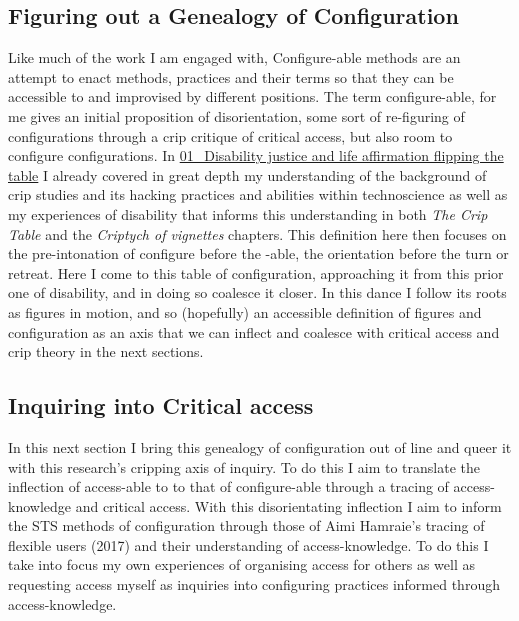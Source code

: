 \hypertarget{figuring-out-a-genealogy-of-configuration-1}{%
\subsection[Figuring out a Genealogy of
Configuration]{\texorpdfstring{\protect\hypertarget{anchor}{}{}Figuring
out a Genealogy of
Configuration}{Figuring out a Genealogy of Configuration}}\label{figuring-out-a-genealogy-of-configuration-1}}

Like much of the work I am engaged with, Configure-able methods are an
attempt to enact methods, practices and their terms so that they can be
accessible to and improvised by different positions. The term
configure-able, for me gives an initial proposition of disorientation,
some sort of re-figuring of configurations through a crip critique of
critical access, but also room to configure configurations. In
\href{../../01_Disability_justice_and_life_affirmation_flipping_the_table/01_Disability\%20justice\%20and\%20life\%20affirmation\%20flipping\%20the\%20table.md}{01\_Disability
justice and life affirmation flipping the table} I already covered in
great depth my understanding of the background of crip studies and its
hacking practices and abilities within technoscience as well as my
experiences of disability that informs this understanding in both
\emph{The Crip Table} and the \emph{Criptych of vignettes} chapters.
This definition here then focuses on the pre-intonation of configure
before the -able, the orientation before the turn or retreat. Here I
come to this table of configuration, approaching it from this prior one
of disability, and in doing so coalesce it closer. In this dance I
follow its roots as figures in motion, and so (hopefully) an accessible
definition of figures and configuration as an axis that we can inflect
and coalesce with critical access and crip theory in the next sections.

\hypertarget{inquiring-into-critical-access}{%
\subsection[Inquiring into Critical
access]{\texorpdfstring{\protect\hypertarget{anchor}{}{}Inquiring into
Critical
access}{Inquiring into Critical access}}\label{inquiring-into-critical-access}}

In this next section I bring this genealogy of configuration out of line
and queer it with this research's cripping axis of inquiry. To do this I
aim to translate the inflection of access-able to to that of
configure-able through a tracing of access-knowledge and critical
access. With this disorientating inflection I aim to inform the STS
methods of configuration through those of Aimi Hamraie's tracing of
flexible users (2017) and their understanding of access-knowledge. To do
this I take into focus my own experiences of organising access for
others as well as requesting access myself as inquiries into configuring
practices informed through access-knowledge.

